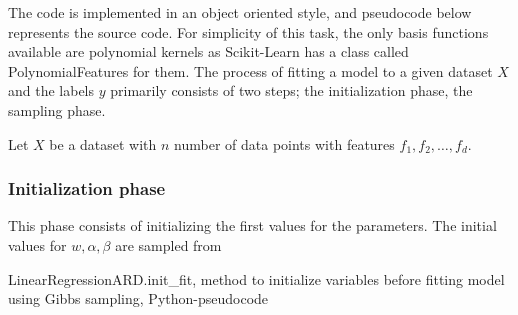 \documentclass[12pt]{article}
\begin{document}
        The code is implemented in an object oriented style, and pseudocode below represents the source code. For simplicity of this task, the only basis functions available are polynomial kernels as Scikit-Learn has a class called PolynomialFeatures \cite{PolynomialFeatures} for them. The process of fitting a model to a given dataset $X$ and the labels $y$ primarily consists of two steps; the initialization phase, the sampling phase.
         
        Let $X$ be a dataset with $n$ number of data points with features $f_1, f_2, \ldots, f_d$. 
        
        \subsubsection{Initialization phase}
            This phase consists of initializing the first values for the parameters. The initial values for $w, \alpha, \beta$ are sampled from 
            \begin{algorithm}[H]
                \caption{LinearRegressionARD.init\_fit, method to initialize variables before fitting model using Gibbs sampling, Python-pseudocode}
                \label{alg:LinearRegressionARD}
                \begin{algorithmic}[1]
                    \algonewline{}
                    \algonewline{}
                \end{algorithmic}
            \end{algorithm}
        
\end{document}
